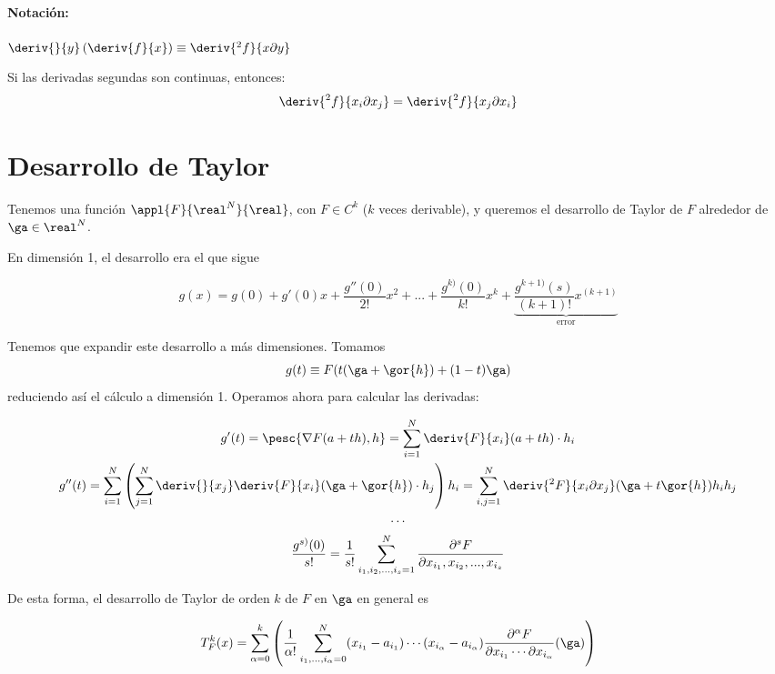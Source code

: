 \paragraph{Notación:}

$\deriv{}{y}\left(\deriv{f}{x}\right) \equiv \deriv{^2f}{x \partial y}$

\begin{theorem}
Si las derivadas segundas son continuas, entonces:
$$\deriv{^2f}{x_i\partial x_j} = \deriv{^2 f}{x_j \partial x_i}$$
\end{theorem}



\section{Desarrollo de Taylor}
Tenemos una función $\appl{F}{\real^N}{\real}$, con $F\in C^k$ ($k$ veces derivable), y queremos el desarrollo de Taylor de $F$ alrededor de $\ga \in \real^N$.

En dimensión 1, el desarrollo era el que sigue

\[ g(x) = g(0) + g'(0)x + \frac{g''(0)}{2!}x^2 + ... + \frac{g^{k)}(0)}{k!}x^k + \underbrace{\frac{g^{k+1)}(s)}{(k+1)!}x^{(k+1)}}_{\text{error}} \]

Tenemos que expandir este desarrollo a más dimensiones. Tomamos \[ g(t) \equiv F(t(\ga + \gor{h}) + (1-t)\ga) \] reduciendo así el cálculo a dimensión 1. Operamos ahora para calcular las derivadas:

\begin{gather*}
g'(t) = \pesc{\nabla F(a+th),h} = \sum_{i=1}^N \deriv{F}{x_i}(a+th)\cdot h_i \\
g''(t) = \sum_{i=1}^N\left(\sum_{j=1}^N \deriv{}{x_j}\deriv{F}{x_i}(\ga+\gor{h})\cdot{h_j}\right)h_i = \sum_{i,j = 1}^N \deriv{^2F}{x_i \partial x_j}(\ga+t\gor{h})h_ih_j \\
\dotsb \\
\frac{g^{s)} (0)}{s!} = \frac{1}{s!}\sum_{i_1,i_2,...,i_s=1}^N \frac{\partial^s F}{\partial x_{i_1},x_{i_2},...,x_{i_s}}
\end{gather*}

De esta forma, el desarrollo de Taylor de orden $k$ de $F$ en $\ga$ en general es

\begin{equation}
T^k_F(x) = \sum_{\alpha = 0}^k
	\left(
		\frac{1}{\alpha !}
		\sum_{i_1,\dotsc,i_\alpha = 0}^N
			(x_{i_1} - a_{i_1}) \dotsb (x_{i_\alpha} - a_{i_\alpha})
			\frac{\partial^\alpha F}{\partial x_{i_1} \dotsb \partial x_{i_\alpha}}
			 (\ga)
	\right)
\end{equation}

